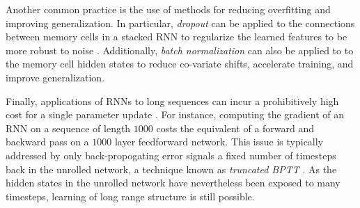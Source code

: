 Another common practice is the use of methods for reducing overfitting and
improving generalization. In particular, \emph{dropout}
\citep{srivastava2014dropout} can be applied to the connections between memory
cells in a stacked RNN to regularize the learned features to be more robust to
noise \citep{zaremba2014recurrent}. Additionally, \emph{batch
normalization} \citep{ioffe2015batch} can also be applied to to the memory cell
hidden states to reduce co-variate shifts, accelerate training, and improve
generalization.

Finally, applications of RNNs to long sequences can incur a prohibitively high
cost for a single parameter update \citep{citeulike:13881859}. For instance,
computing the gradient of an RNN on a sequence of length $1000$ costs the
equivalent of a forward and backward pass on a $1000$ layer feedforward
network. This issue is typically addressed by only back-propogating error
signals a fixed number of timesteps back in the unrolled network, a technique
known as \emph{truncated BPTT} \citep{williams1990efficient}. As the hidden
states in the unrolled network have nevertheless been exposed to many timesteps,
learning of long range structure is still possible.
